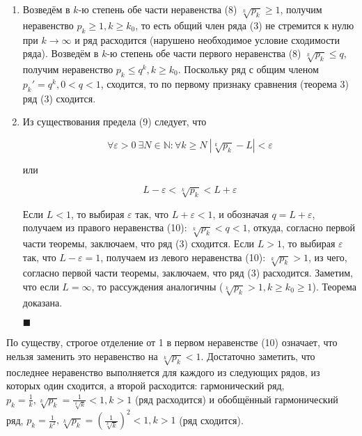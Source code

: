 \begin{enumerate}
	\item Возведём в $k$-ю степень обе части неравенства (8) $\sqrt[k]{p_k} \geqslant 1$, получим неравенство $p_k \geqslant 1, k \geqslant k_0$, то есть общий член ряда (3) не стремится к нулю при $k \rightarrow \infty$ и ряд расходится (нарушено необходимое условие сходимости ряда). Возведём в $k$-ю степень обе части первого неравенства (8) $\sqrt[k]{p_k} \leqslant q$, получим неравенство $p_k \leqslant q^k, k \geqslant k_0$. Поскольку ряд с общим членом $p_k' = q^k, 0 < q < 1$, сходится, то по первому признаку сравнения (теорема 3) ряд (3) сходится.
	
	\item Из существования предела (9) следует, что
	
	\begin{equation*}
		\forall\varepsilon > 0\ \exists N\in \mathbb{N}: \forall k \geqslant N\ |\sqrt[k]{p_k} - L| < \varepsilon
	\end{equation*}
	
	или 
	
	\begin{equation}
		L - \varepsilon < \sqrt[k]{p_k} < L + \varepsilon
	\end{equation}
	
	Если $L < 1$, то выбирая $\varepsilon$ так, что $L + \varepsilon < 1$, и обозначая $q = L + \varepsilon$, получаем из правого неравенства (10): $\sqrt[k]{p_k} < q < 1$, откуда, согласно первой части теоремы, заключаем, что ряд (3) сходится. Если $L > 1$, то выбирая $\varepsilon$ так, что $L - \varepsilon = 1$, получаем из левого неравенства (10): $\sqrt[k]{p_k} > 1$, из чего, согласно первой части теоремы, заключаем, что ряд (3) расходится. Заметим, что если $L = \infty$, то рассуждения аналогичны ($\sqrt[k]{p_k} > 1, k \geqslant k_0 \geqslant 1$). Теорема доказана.
	\begin{flushright}
		$\blacksquare$
	\end{flushright}
\end{enumerate}

\begin{note}
	По существу, строгое отделение от 1 в первом неравенстве (10) означает, что нельзя заменить это неравенство на $\sqrt[k]{p_k} < 1$. Достаточно заметить, что последнее  неравенство выполняется для каждого  из следующих рядов, из которых один сходится, а второй расходится: гармонический ряд, $p_k = \frac{1}{k}, \sqrt[k]{p_k} = \frac{1}{\sqrt[k]{k}} < 1, k > 1$ (ряд расходится) и обобщённый гармонический ряд, $p_k = \frac{1}{k^2}, \sqrt[k]{p_k} = \left( \frac{1}{\sqrt[k]{k}} \right)^2 < 1, k > 1$ (ряд сходится).
\end{note}

